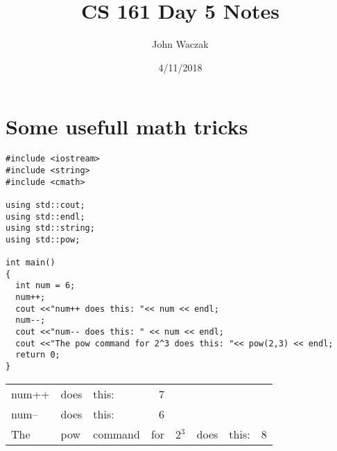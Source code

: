 \documentclass[11pt]{article}
\author{John Waczak}
\date{4/11/2018}
\title{CS 161 Day 5 Notes}
\begin{document}
\maketitle

\section*{Some usefull math tricks}
\label{sec-1}
\begin{verbatim}
#include <iostream>
#include <string>
#include <cmath>

using std::cout;
using std::endl;
using std::string;
using std::pow;

int main()
{
  int num = 6;
  num++;
  cout <<"num++ does this: "<< num << endl;
  num--;
  cout <<"num-- does this: " << num << endl;
  cout <<"The pow command for 2^3 does this: "<< pow(2,3) << endl;
  return 0;
}
\end{verbatim}

\begin{center}
\begin{tabular}{lllrllll}
num++ & does & this: & 7 &  &  &  & \\
num-- & does & this: & 6 &  &  &  & \\
The & pow & command & for & 2$^{\text{3}}$ & does & this: & 8\\
\end{tabular}
\end{center}
\end{document}
